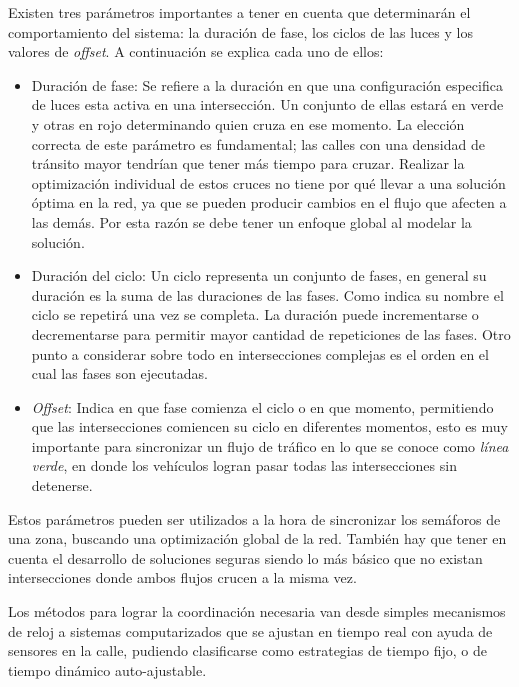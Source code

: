 Existen tres parámetros importantes a tener en cuenta que determinarán el comportamiento del sistema: la duración de fase, los ciclos de las luces y los valores de \emph{offset}. 
A continuación se explica cada uno de ellos:


\begin{itemize}
 	\item Duración de fase: Se refiere a la duración en que una configuración especifica de luces esta activa en una intersección. Un conjunto de ellas estará en verde y otras en rojo determinando quien cruza en ese momento. La elección correcta de este parámetro es fundamental; las calles con una densidad de tránsito mayor tendrían que tener más tiempo para cruzar. Realizar la optimización individual de estos cruces no tiene por qué llevar a una solución óptima en la red, ya que se pueden producir cambios en el flujo que afecten a las demás. Por esta razón se debe tener un enfoque global al modelar la solución.
 	
 	\item Duración del ciclo: Un ciclo representa un conjunto de fases, en general su duración es la suma de las duraciones de las fases. Como indica su nombre el ciclo se repetirá una vez se completa. La duración puede incrementarse o decrementarse para permitir mayor cantidad de repeticiones de las fases. Otro punto a considerar sobre todo en intersecciones complejas es el orden en el cual las fases son ejecutadas.
 	
 	\item \emph{Offset}: Indica en que fase comienza el ciclo o en que momento, permitiendo que las intersecciones comiencen su ciclo en diferentes momentos, esto es muy importante para sincronizar un flujo de tráfico en lo que se conoce como \emph{línea verde}, en donde los vehículos logran pasar todas las intersecciones sin detenerse.
\end{itemize}

Estos parámetros pueden ser utilizados a la hora de sincronizar los semáforos de una zona, buscando una optimización global de la red. También hay que tener en cuenta el desarrollo de soluciones seguras siendo lo más básico que no existan intersecciones donde ambos flujos crucen a la misma vez.

Los métodos para lograr la coordinación necesaria van desde simples mecanismos de reloj a sistemas computarizados que se ajustan en tiempo real con ayuda de sensores en la calle, pudiendo clasificarse como estrategias de tiempo fijo, o de tiempo dinámico auto-ajustable.

